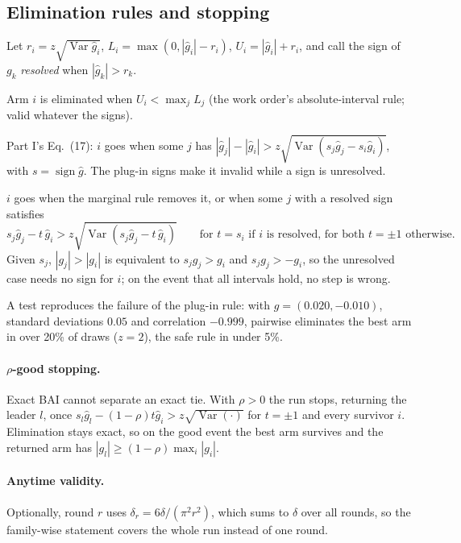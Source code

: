 \documentclass[10.5pt]{article}
\newcommand{\Var}{\operatorname{Var}}
\begin{document}
\subsection{Elimination rules and stopping}
\label{sec:rules}

Let $r_i=z\sqrt{\Var\hat g_i}$, $L_i=\max(0,|\hat g_i|-r_i)$, $U_i=|\hat g_i|+r_i$, and call the sign of $g_k$ \emph{resolved} when $|\hat g_k|>r_k$.
\begin{description}[leftmargin=5.4em,labelwidth=5em]
  \item[marginal] Arm $i$ is eliminated when $U_i<\max_jL_j$ (the work order's absolute-interval rule; valid whatever the signs).
  \item[pairwise] Part I's Eq.~(17): $i$ goes when some $j$ has $|\hat g_j|-|\hat g_i|>z\sqrt{\Var(s_j\hat g_j-s_i\hat g_i)}$, with $s=\operatorname{sign}\hat g$. The plug-in signs make it invalid while a sign is unresolved.
  \item[safe] $i$ goes when the marginal rule removes it, or when some $j$ with a resolved sign satisfies
  \[
    s_j\hat g_j-t\,\hat g_i>z\sqrt{\Var(s_j\hat g_j-t\,\hat g_i)}\qquad\text{for } t=s_i \text{ if $i$ is resolved, for both } t=\pm1 \text{ otherwise.}
  \]
  Given $s_j$, $|g_j|>|g_i|$ is equivalent to $s_jg_j>g_i$ and $s_jg_j>-g_i$, so the unresolved case needs no sign for $i$; on the event that all intervals hold, no step is wrong.
\end{description}
A test reproduces the failure of the plug-in rule: with $g=(0.020,-0.010)$, standard deviations $0.05$ and correlation $-0.999$, pairwise eliminates the best arm in over 20\% of draws ($z=2$), the safe rule in under 5\%.

\paragraph{$\rho$-good stopping.}
Exact BAI cannot separate an exact tie. With $\rho>0$ the run stops, returning the leader $l$, once $s_l\hat g_l-(1-\rho)t\hat g_i>z\sqrt{\Var(\cdot)}$ for $t=\pm1$ and every survivor $i$. Elimination stays exact, so on the good event the best arm survives and the returned arm has $|g_l|\ge(1-\rho)\max_i|g_i|$.

\paragraph{Anytime validity.}
Optionally, round $r$ uses $\delta_r=6\delta/(\pi^2r^2)$, which sums to $\delta$ over all rounds, so the family-wise statement covers the whole run instead of one round.
\end{document}
